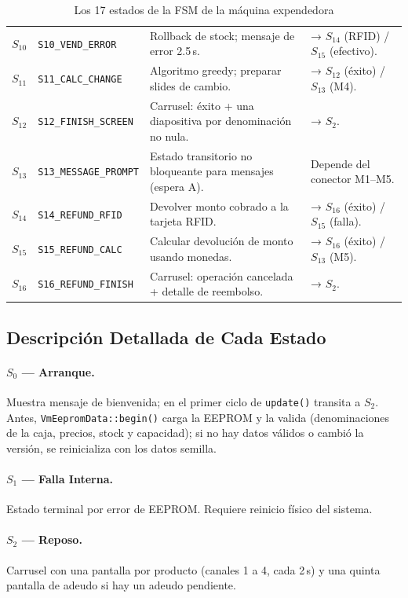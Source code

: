 \documentclass[12pt,a4paper]{article}
\begin{document}
\begin{table}[H]
\begin{tabular}{clp{4.2cm}p{4.2cm}}
$S_{10}$& \texttt{S10\_VEND\_ERROR} & Rollback de stock; mensaje de error 2.5\,s. & → $S_{14}$ (RFID) / $S_{15}$ (efectivo). \\
$S_{11}$& \texttt{S11\_CALC\_CHANGE}& Algoritmo greedy; preparar slides de cambio. & → $S_{12}$ (éxito) / $S_{13}$ (M4). \\
$S_{12}$& \texttt{S12\_FINISH\_SCREEN} & Carrusel: éxito + una diapositiva por denominación no nula. & → $S_2$. \\
$S_{13}$& \texttt{S13\_MESSAGE\_PROMPT} & Estado transitorio no bloqueante para mensajes (espera A). & Depende del conector M1--M5. \\
$S_{14}$& \texttt{S14\_REFUND\_RFID} & Devolver monto cobrado a la tarjeta RFID. & → $S_{16}$ (éxito) / $S_{15}$ (falla). \\
$S_{15}$& \texttt{S15\_REFUND\_CALC} & Calcular devolución de monto usando monedas. & → $S_{16}$ (éxito) / $S_{13}$ (M5). \\
$S_{16}$& \texttt{S16\_REFUND\_FINISH} & Carrusel: operación cancelada + detalle de reembolso. & → $S_2$. \\
\bottomrule
\end{tabular}
\caption{Los 17 estados de la FSM de la máquina expendedora}
\end{table}

\subsection{Descripción Detallada de Cada Estado}

\paragraph{$S_0$ — Arranque.} Muestra mensaje de bienvenida; en el primer
ciclo de \texttt{update()} transita a $S_2$. Antes, \texttt{VmEepromData::begin()}
carga la EEPROM y la valida (denominaciones de la caja, precios, stock y
capacidad); si no hay datos válidos o cambió la versión, se reinicializa con
los datos semilla.

\paragraph{$S_1$ — Falla Interna.} Estado terminal por error de EEPROM.
Requiere reinicio físico del sistema.

\paragraph{$S_2$ — Reposo.} Carrusel con una pantalla por producto (canales
1 a 4, cada 2\,s) y una quinta pantalla de adeudo si hay un adeudo pendiente.
\end{document}
